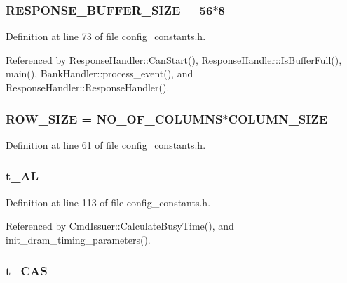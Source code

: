 \subsubsection[{RESPONSE\_\-BUFFER\_\-SIZE}]{ {\bf RESPONSE\_\-BUFFER\_\-SIZE} = 56$\ast$8}\label{config__constants_8h_15d2d426c9f48f49b5b35c3953238331}




Definition at line 73 of file config\_\-constants.h.

Referenced by ResponseHandler::CanStart(), ResponseHandler::IsBufferFull(), main(), BankHandler::process\_\-event(), and ResponseHandler::ResponseHandler().
\subsubsection[{ROW\_\-SIZE}]{ {\bf ROW\_\-SIZE} = {\bf NO\_\-OF\_\-COLUMNS}$\ast${\bf COLUMN\_\-SIZE}}\label{config__constants_8h_06612380f279606f69a92c2c5b4e7a0a}




Definition at line 61 of file config\_\-constants.h.
\subsubsection[{t\_\-AL}]{ {\bf t\_\-AL}}\label{config__constants_8h_00d8a8f3f7c90331db7294a4766e73cf}




Definition at line 113 of file config\_\-constants.h.

Referenced by CmdIssuer::CalculateBusyTime(), and init\_\-dram\_\-timing\_\-parameters().
\subsubsection[{t\_\-CAS}]{ {\bf t\_\-CAS}}\label{config__constants_8h_3650e278079b6a0bf6732709f2637bad}




